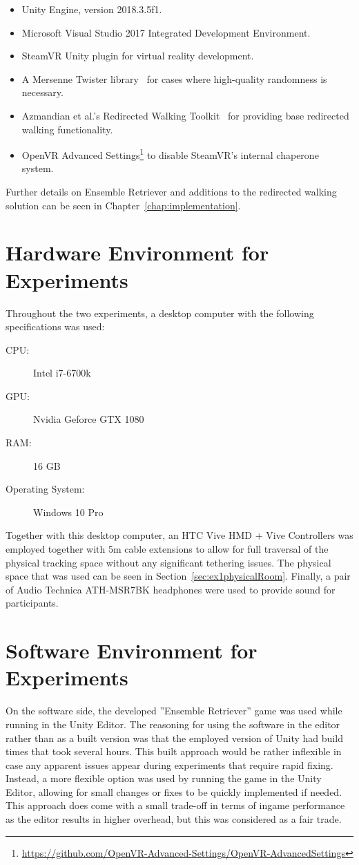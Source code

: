 \begin{itemize}
    \item Unity Engine, version 2018.3.5f1.
    \item Microsoft Visual Studio 2017 Integrated Development Environment.
    \item SteamVR Unity plugin for virtual reality development.
    \item A Mersenne Twister library~\cite{MersenneTwisterLibraryLink} for cases where high-quality randomness is necessary.
    \item Azmandian et al.'s Redirected Walking Toolkit~\cite{azmandian2016redirected} for providing base redirected walking functionality.
    \item OpenVR Advanced Settings\footnote{\url{https://github.com/OpenVR-Advanced-Settings/OpenVR-AdvancedSettings}} to disable SteamVR's internal chaperone system.
\end{itemize}

Further details on Ensemble Retriever and additions to the redirected walking solution can be seen in Chapter~\ref{chap:implementation}.

\section{Hardware Environment for Experiments}
Throughout the two experiments, a desktop computer with the following specifications was used:
\begin{description}
   \item[CPU:] Intel i7-6700k
   \item[GPU:] Nvidia Geforce GTX 1080
   \item[RAM:] 16 GB
   \item[Operating System:] Windows 10 Pro
\end{description}

Together with this desktop computer, an HTC Vive HMD + Vive Controllers was employed together with 5m cable extensions to allow for full traversal of the physical tracking space without any significant tethering issues. The physical space that was used can be seen in Section~\ref{sec:ex1physicalRoom}. Finally, a pair of Audio Technica ATH-MSR7BK headphones were used to provide sound for participants. 

\section{Software Environment for Experiments}
On the software side, the developed ''Ensemble Retriever'' game was used while running in the Unity Editor. The reasoning for using the software in the editor rather than as a built version was that the employed version of Unity had build times that took several hours. This built approach would be rather inflexible in case any apparent issues appear during experiments that require rapid fixing. Instead, a more flexible option was used by running the game in the Unity Editor, allowing for small changes or fixes to be quickly implemented if needed. This approach does come with a small trade-off in terms of ingame performance as the editor results in higher overhead, but this was considered as a fair trade. 